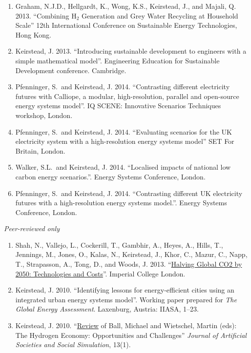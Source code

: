 \documentclass[11pt,a4paper]{article}
\newcommand{\marginhead}[1]{\marginpar{\textsf{{\footnotesize #1}}}}
\begin{document}
\begin{enumerate}
\item Graham, N.J.D., Hellgardt, K., Wong, K.S., Keirstead, J., and Majali, Q. 2013. ``Combining H$_2$ Generation and Grey Water Recycling at Household Scale'' 12th International Conference on Sustainable Energy Technologies, Hong Kong.

\item Keirstead, J. 2013. ``Introducing sustainable development to engineers with a simple mathematical model''.  Engineering Education for Sustainable Development conference.  Cambridge.

\item Pfenninger, S.\ and Keirstead, J. 2014. ``Contrasting different electricity futures with Calliope, a modular, high-resolution, parallel and open-source energy systems model''.  IQ SCENE: Innovative Scenarios Techniques workshop, London.

\item Pfenninger, S.\ and Keirstead, J. 2014. ``Evaluating scenarios for the UK electricity system with a high-resolution energy systems model'' SET For Britain, London.

\item Walker, S.L.\ and Keirstead, J. 2014. ``Localised impacts of national low carbon energy scenarios.''.  Energy Systems Conference, London.

\item Pfenninger, S.\ and Keirstead, J. 2014. ``Contrasting different UK electricity futures with a high-resolution energy systems model.''.  Energy Systems Conference, London.
\end{enumerate}

\bigskip

\noindent\marginhead{Reports and\\other writing}%
% 
\emph{Peer-reviewed only}
\medskip
\begin{enumerate}
\item Shah, N., Vallejo, L., Cockerill, T., Gambhir, A., Heyes, A., Hills, T., Jennings, M., Jones, O., Kalas, N., Keirstead, J., Khor, C., Mazur, C., Napp, T., Strapasson, A., Tong, D., and Woods, J. 2013. ``\href{http://www3.imperial.ac.uk/climatechange/publications/collaborative/halving-global-co2-by-2050}{Halving Global CO2 by 2050: Technologies and Costs}''.  Imperial College London.


\item Keirstead, J. 2010. ``Identifying lessons for energy-efficient cities using an integrated urban energy systems model''.  Working paper prepared for \emph{The Global Energy Assessment}.  Laxenburg, Austria: IIASA, 1--23.

\item Keirstead, J. 2010. ``\href{http://jasss.soc.surrey.ac.uk/13/1/reviews/keirstead.html}{Review} of Ball, Michael and Wietschel, Martin (eds): The Hydrogen Economy: Opportunities and Challenges'' \emph{Journal of Artificial Societies and Social Simulation}, 13(1).


\end{enumerate}
\end{document}
